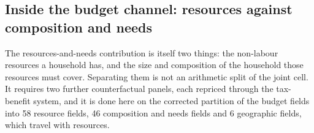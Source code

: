 \subsection{Inside the budget channel: resources against composition and needs}\label{inside-the-budget-channel-resources-against-composition-and-needs}

The resources-and-needs contribution is itself two things: the non-labour resources a household has, and the size and composition of the household those resources must cover. Separating them is not an arithmetic split of the joint cell. It requires two further counterfactual panels, each repriced through the tax-benefit system, and it is done here on the corrected partition of the budget fields into 58 resource fields, 46 composition and needs fields and 6 geographic fields, which travel with resources.

